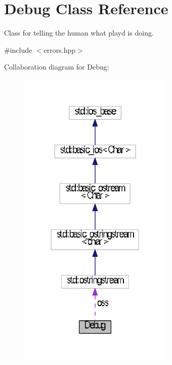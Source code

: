 \hypertarget{classDebug}{\section{Debug Class Reference}
\label{classDebug}
}


Class for telling the human what playd is doing.  




{\ttfamily \#include $<$errors.\+hpp$>$}



Collaboration diagram for Debug\+:
\nopagebreak
\begin{figure}[H]
\begin{center}
\leavevmode
\includegraphics[width=210pt]{classDebug__coll__graph}
\end{center}
\end{figure}
